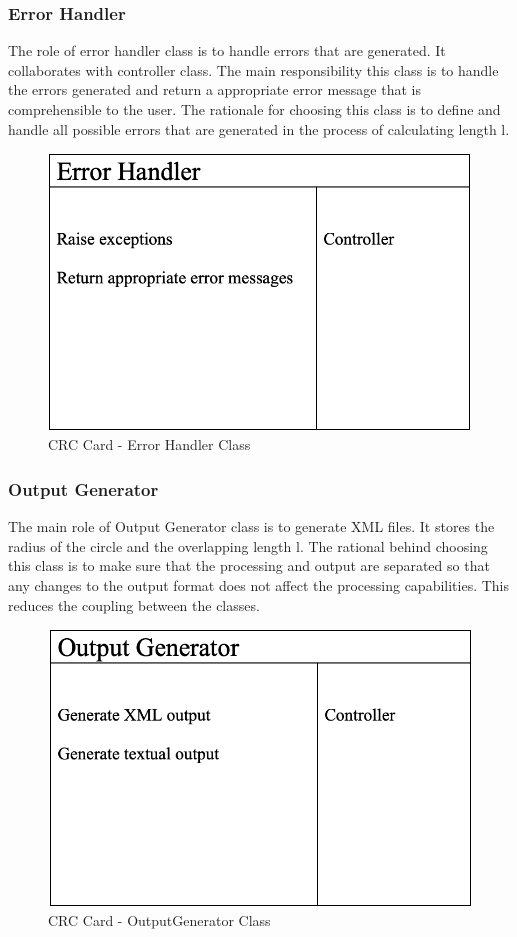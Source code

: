     \subsubsection{Error Handler}
      \parbox{1.0\linewidth}{
        The role of error handler class is to handle errors that are generated. It collaborates with controller class. The main responsibility this class is to handle the errors generated and return a appropriate error message that is comprehensible to the user. The rationale for choosing this class is to define and handle all possible errors that are generated in the process of calculating length l.
      }
      \vspace*{2em}
      \begin{figure}[h!]
        \centering
        \includegraphics[width=.5\linewidth]{resources/ErrorHandler.png}
        \caption{CRC Card - Error Handler Class}\label{fig:error}
      \end{figure}

    \subsubsection{Output Generator}
      \parbox{1.0\linewidth}{
        The main role of Output Generator class is to generate XML files. It stores the radius of the circle and the overlapping length l. The rational behind choosing this class is to make sure that the processing and output are separated so that any changes to the output format does not affect the processing capabilities. This reduces the coupling between the classes.
      }
      \vspace*{2em}
      \begin{figure}[h!]
        \centering
        \includegraphics[width=.5\linewidth]{resources/OutputGenerator.png}
        \caption{CRC Card - OutputGenerator Class}\label{fig:output}
      \end{figure}

